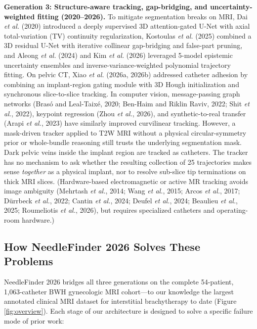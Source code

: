 \documentclass[
  11pt,
]{article}
\begin{document}
\textbf{Generation 3: Structure-aware tracking, gap-bridging, and
uncertainty-weighted fitting (2020--2026).} To mitigate segmentation
breaks on MRI, Dai \emph{et al.} (2020) introduced a deeply supervised
3D attention-gated U-Net with axial total-variation (TV) continuity
regularization, Kostoulas \emph{et al.} (2025) combined a 3D residual
U-Net with iterative collinear gap-bridging and false-part pruning, and
Aleong \emph{et al.} (2024) and Kim \emph{et al.} (2026) leveraged
5-model epistemic uncertainty ensembles and inverse-variance-weighted
polynomial trajectory fitting. On pelvic CT, Xiao \emph{et al.} (2026a,
2026b) addressed catheter adhesion by combining an implant-region gating
module with 3D Hough initialization and synchronous slice-to-slice
tracking. In computer vision, message-passing graph networks (Brasó and
Leal-Taixé, 2020; Ben-Haim and Riklin Raviv, 2022; Shit \emph{et al.},
2022), keypoint regression (Zhou \emph{et al.}, 2026), and
synthetic-to-real transfer (Arapi \emph{et al.}, 2023) have similarly
improved curvilinear tracking. However, a mask-driven tracker applied to
T2W MRI without a physical circular-symmetry prior or whole-bundle
reasoning still trusts the underlying segmentation mask. Dark pelvic
veins inside the implant region are tracked as catheters. The tracker
has no mechanism to ask whether the resulting collection of 25
trajectories makes sense \emph{together} as a physical implant, nor to
resolve sub-slice tip terminations on thick MRI slices. (Hardware-based
electromagnetic or active MR tracking avoids image ambiguity (Mehrtash
\emph{et al.}, 2014; Wang \emph{et al.}, 2015; Arcos \emph{et al.},
2017; Dürrbeck \emph{et al.}, 2022; Cantin \emph{et al.}, 2024; Deufel
\emph{et al.}, 2024; Beaulieu \emph{et al.}, 2025; Roumeliotis \emph{et
al.}, 2026), but requires specialized catheters and operating-room
hardware.)

\subsection{How NeedleFinder 2026 Solves These
Problems}\label{how-needlefinder-2026-solves-these-problems}

NeedleFinder 2026 bridges all three generations on the complete
54-patient, 1,063-catheter BWH gynecologic MRI cohort---to our knowledge
the largest annotated clinical MRI dataset for interstitial
brachytherapy to date (Figure \ref{fig:overview}). Each stage of our
architecture is designed to solve a specific failure mode of prior work:
\end{document}
